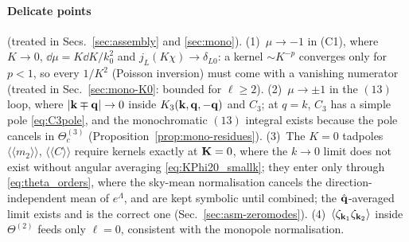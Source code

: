 \paragraph{Delicate points} (treated in Secs.~\ref{sec:assembly} and \ref{sec:mono}).
(1)~$\mu\to-1$ in (C1), where $K\to0$, $\dd\mu=K\dd K/k_0^2$ and $j_L(K\chi)\to\delta_{L0}$: a kernel $\sim K^{-p}$ converges only for $p<1$, so
every $1/K^2$ (Poisson inversion) must come with a vanishing numerator (treated in Sec.~\ref{sec:mono-K0}: bounded for $\ell\ge2$).
(2)~$\mu\to\pm1$ in the $(13)$ loop, where $|\mathbf k\mp\mathbf q|\to0$ inside $K_3(\mathbf k,\mathbf q,-\mathbf q)$ and $C_3$; at $q=k$, $C_3$ has a simple pole
\eqref{eq:C3pole}, and the monochromatic $(13)$ integral exists because the pole cancels in $\Theta^{(3)}_c$ (Proposition~\ref{prop:mono-residues}).
(3)~The $K=0$ tadpoles $\langle\!\langle m_2\rangle\!\rangle$, $\langle\!\langle C\rangle\!\rangle$ require kernels exactly at $\mathbf K=0$, where the $k\to0$ limit does
not exist without angular averaging \eqref{eq:KPhi20_smallk}; they enter only through \eqref{eq:theta_orders}, where the sky-mean
normalisation cancels the direction-independent mean of $e^\Lambda$, and are kept symbolic until combined; the $\hat{\mathbf q}$-averaged limit exists and is the correct one (Sec.~\ref{sec:asm-zeromodes}).
(4)~$\langle\zeta_{\mathbf k_1}\zeta_{\mathbf k_2}\rangle$ inside $\Theta^{(2)}$ feeds only $\ell=0$, consistent with the monopole normalisation.
